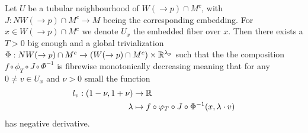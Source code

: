 	\begin{lemma}\label{lem: fibrewise monotopnically}
		Let $U$ be a tubular neighbourhood of $W(\to p)\cap M^c$, with $J:NW(\to p)\cap M^c\to M$ beeing the corresponding embedding. For $x\in W(\to p)\cap M^c$ we denote $U_x$ the embedded fiber over $x$. Then there exists a $T>0$ big enough and a global trivialization $\Phi: NW(\to p)\cap M^c\to  \left(W(\to p)\cap M^c\right)\times \mathbb{R}^{\lambda_p}$ such that the the composition $f\circ \phi_T \circ J\circ \Phi^{-1}$ is fibrewise monotonically decreasing meaning that for any  $0\neq v\in U_x$  and $\nu >0 $ small the function
		\begin{align*}
			l_v: (1-\nu,1+\nu) &\to \mathbb{R}\\
			\lambda &\mapsto f\circ \varphi_T \circ J\circ \Phi^{-1}(x,\lambda \cdot v)
		\end{align*} has negative derivative.
	\end{lemma}
